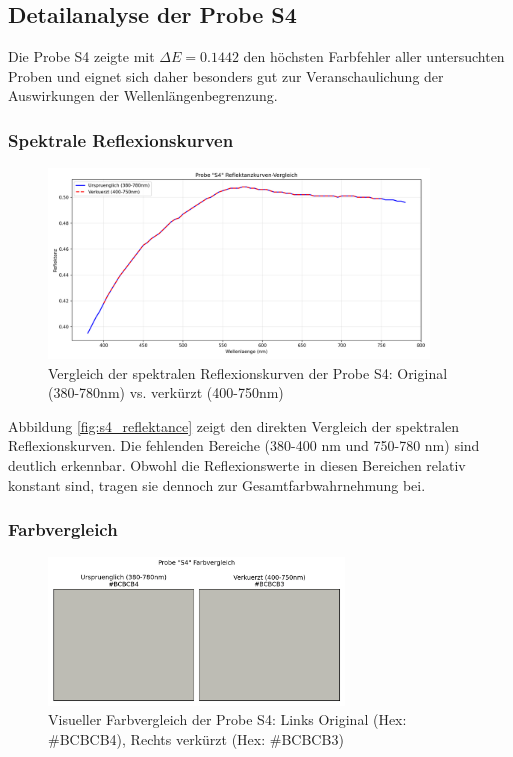 \subsection{Detailanalyse der Probe S4}

Die Probe S4 zeigte mit $\Delta E = 0.1442$ den höchsten Farbfehler aller untersuchten Proben und eignet sich daher besonders gut zur Veranschaulichung der Auswirkungen der Wellenlängenbegrenzung.

\subsubsection{Spektrale Reflexionskurven}

\begin{figure}[htbp]
    \centering
    \includegraphics[width=0.9\textwidth]{./figures/S4_reflektanz.png}
    \caption{Vergleich der spektralen Reflexionskurven der Probe S4: Original (380-780nm) vs. verkürzt (400-750nm)}
    \label{fig:s4_reflectance}
\end{figure}

Abbildung \ref{fig:s4_reflektance} zeigt den direkten Vergleich der spektralen Reflexionskurven. Die fehlenden Bereiche (380-400 nm und 750-780 nm) sind deutlich erkennbar. Obwohl die Reflexionswerte in diesen Bereichen relativ konstant sind, tragen sie dennoch zur Gesamtfarbwahrnehmung bei.

\subsubsection{Farbvergleich}

\begin{figure}[htbp]
    \centering
    \includegraphics[width=0.7\textwidth]{./figures/S4_farbe.png}
    \caption{Visueller Farbvergleich der Probe S4: Links Original (Hex: \#BCBCB4), Rechts verkürzt (Hex: \#BCBCB3)}
    \label{fig:s4_color}
\end{figure}


